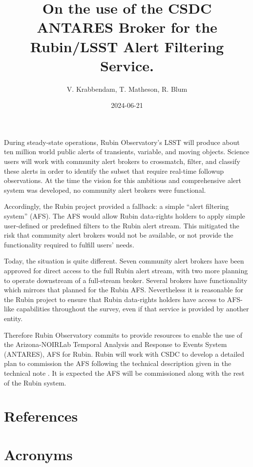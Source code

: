 \documentclass[DM,authoryear]{lsstdoc}
\title{On the use of the CSDC ANTARES Broker for the Rubin/LSST Alert Filtering Service.}
\author{V. Krabbendam, T. Matheson, R. Blum}
\date{2024-06-21}
\begin{document}
        
\mkmemotitle

During steady-state operations, Rubin Observatory's LSST will produce about ten million world public alerts of transients, variable, and moving objects. Science users will work with community alert
brokers to crossmatch, filter, and classify these alerts in order to identify the subset that require real-time followup observations. 
At the time the vision for this ambitious and comprehensive alert system was developed, no community alert brokers were functional.

Accordingly, the Rubin project provided a fallback: a simple “alert filtering system” (AFS). 
The AFS would allow Rubin data-rights holders to apply simple user-defined or predefined filters to the Rubin alert stream. 
This mitigated the risk that community alert brokers would not be available, or not provide the functionality required to fulfill users' needs.

Today, the situation is quite different. 
Seven community alert brokers have been approved for direct access to the full Rubin alert stream, with two more planning to operate downstream of a full-stream broker. 
Several brokers have functionality which mirrors that planned for the Rubin AFS. 
Nevertheless it is reasonable for the Rubin project to ensure that Rubin data-rights holders have access to AFS-like capabilities throughout the survey, even if that service is provided by another entity.

Therefore Rubin Observatory commits to provide resources to enable the use of the Arizona-NOIRLab Temporal Analysis and Response to Events System (ANTARES),   \citep{2021AJ....161..107M} AFS for Rubin. 
Rubin will work with CSDC to develop a detailed plan to commission the AFS following the technical description given in the  technical note . 
It is expected the AFS will be commissioned along with the rest of the Rubin system. 

\clearpage
\appendix
\section{References} \label{sec:bib}
\renewcommand{\refname}{} %


\section{Acronyms} \label{sec:acronyms}

\end{document}
